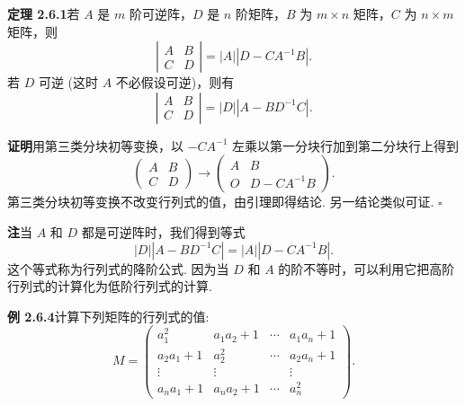 \documentclass[UTF8, 12pt, fontset=fandol, oneside]{ctexart}
\begin{document}
\noindent\textbf{定理 2.6.1}\quad 若 $A$ 是 $m$ 阶可逆阵，$D$ 是 $n$ 阶矩阵，$B$ 为 $m\times n$ 矩阵，$C$ 为 $n\times m$ 矩阵，则
\[
\left|\begin{array}{cc}
A & B\\
C & D
\end{array}\right|=|A||D-CA^{-1}B|.
\]
若 $D$ 可逆 (这时 $A$ 不必假设可逆)，则有
\[
\left|\begin{array}{cc}
A & B\\
C & D
\end{array}\right|=|D||A-BD^{-1}C|.
\]

\noindent\textbf{证明}\quad 用第三类分块初等变换，以 $-CA^{-1}$ 左乘以第一分块行加到第二分块行上得到
\[
\left(\begin{array}{cc}
A & B\\
C & D
\end{array}\right)\longrightarrow
\left(\begin{array}{cc}
A & B\\
O & D-CA^{-1}B
\end{array}\right).
\]
第三类分块初等变换不改变行列式的值，由引理即得结论. 另一结论类似可证. $\square$

\noindent\textbf{注}\quad 当 $A$ 和 $D$ 都是可逆阵时，我们得到等式
\[
|D||A-BD^{-1}C|=|A||D-CA^{-1}B|.
\]
这个等式称为行列式的降阶公式. 因为当 $D$ 和 $A$ 的阶不等时，可以利用它把高阶行列式的计算化为低阶行列式的计算.

\noindent\textbf{例 2.6.4}\quad 计算下列矩阵的行列式的值:
\[
M=\left(\begin{array}{cccc}
a_1^2 & a_1a_2+1 & \cdots & a_1a_n+1\\
a_2a_1+1 & a_2^2 & \cdots & a_2a_n+1\\
\vdots & \vdots & & \vdots\\
a_na_1+1 & a_na_2+1 & \cdots & a_n^2
\end{array}\right).
\]
\end{document}
